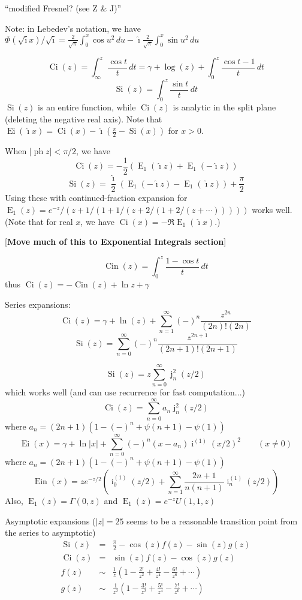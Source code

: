 \documentclass[10pt,dvipdfmx,letterpaper,twoside]{article}
\let\O=\operatorname
\newcommand{\ii}{{\hat{\imath}}}
\let\gam=\gamma
\let\Gam=\Gamma
\begin{document}
``modified Fresnel? (see Z \& J)''

Note: in Lebedev's notation, we have
$\Phi(\sqrt\ii x)/\sqrt\ii = \frac{2}{\sqrt\pi}\int_0^x\cos u^2\,du -  \ii\frac{2}{\sqrt\pi}\int_0^x\sin u^2\,du$

\[ \O{Ci}(z) = \int_\infty^z\frac{\cos t}{t}\,dt = \gam + \log(z) + \int_0^z \frac{\cos t - 1}{t}\,dt \]
\[ \O{Si}(z) = \int_0^z \frac{\sin t}{t}\,dt \]
$\O{Si}(z)$ is an entire function, while $\O{Ci}(z)$ is analytic in the split plane (deleting the negative real axis).
Note that $\O{Ei}(\ii x) = \O{Ci}(x) - \ii(\frac\pi2 - \O{Si}(x))$ for $x>0$.

When $|\O{ph} z| < \pi/2$, we have
\[ \O{Ci}(z) = -\frac12\left( \O{E}_1(\ii z) + \O{E}_1(-\ii z) \right) \]
\[ \O{Si}(z) = \frac\ii2\left( \O{E}_1(-\ii z) - \O{E}_1(\ii z) \right) + \frac\pi2 \]
Using these with continued-fraction expansion for $\O{E}_1(z) = e^{-z}/(z+1/(1+1/(z+2/(1+2/(z+\cdots)))))$ works well.
(Note that for real $x$, we have $\O{Ci}(x) = -\Re \O{E}_1(\ii x)$.)

[{\bf Move much of this to Exponential Integrals section}]

\[ \O{Cin}(z) = \int_0^z\frac{1-\cos t}{t}\,dt \]
thus $\O{Ci}(z) = -\O{Cin}(z) + \ln z + \gam$

Series expansions:
\[ \O{Ci}(z) = \gamma + \ln(z) + \sum_{n=1}^\infty (-)^n \frac{z^{2n}}{(2n)!(2n)} \]
\[ \O{Si}(z) = \sum_{n=0}^\infty (-)^n \frac{z^{2n+1}}{(2n+1)!(2n+1)} \]

\[ \O{Si}(z) = z\sum_{n=0}^\infty \O{j}^2_n(z/2) \]
which works well (and can use recurrence for fast computation...)
\[ \O{Ci}(z) = \sum_{n=0}^\infty a_n\O{j}^2_n(z/2) \]
where $a_n = (2n+1)\left(1 - (-)^n + \psi(n+1) - \psi(1)\right)$
\[ \O{Ei}(x) = \gam + \ln|x| + \sum_{n=0}^\infty (-)^n (x-a_n) \O{i}^{(1)}(x/2)^2 \qquad (x\neq 0) \]
where $a_n = (2n+1)\left(1 - (-)^n + \psi(n+1) - \psi(1)\right)$
\[ \O{Ein}(x) = z e^{-z/2}\left( \O{i}^{(1)}_0(z/2) + \sum_{n=1}^\infty \frac{2n+1}{n(n+1)} \O{i}^{(1)}_n(z/2) \right) \]
Also, $\O{E}_1(z) = \Gam(0,z)$ and $\O{E}_1(z) = e^{-z} U(1,1,z)$

Asymptotic expansions ($|z|=25$ seems to be a reasonable transition point from the series to asymptotic)
\begin{eqnarray*}
\O{Si}(z) &=& \frac\pi2 - \cos(z) f(z) - \sin(z) g(z) \\
\O{Ci}(z) &=& \sin(z) f(z) - \cos(z) g(z) \\
f(z) &\sim& \frac1z\left(1 - \frac{2!}{z^2} + \frac{4!}{z^4} - \frac{6!}{z^6} + \cdots \right) \\
g(z) &\sim& \frac1{z^2}\left(1 - \frac{3!}{z^2} + \frac{5!}{z^4} - \frac{7!}{z^6} + \cdots \right)
\end{eqnarray*}
\end{document}
